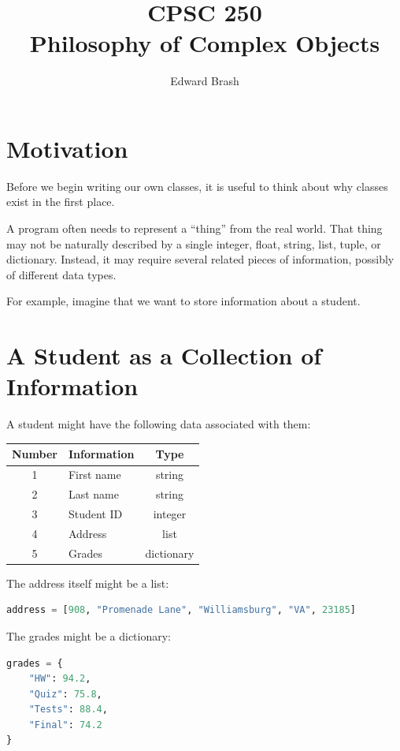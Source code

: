 \documentclass[11pt]{article}
\title{CPSC 250 \\ Philosophy of Complex Objects}
\author{Edward Brash}
\date{}
\begin{document}
\maketitle

\section{Motivation}

Before we begin writing our own classes, it is useful to think about why classes exist in the first place.

A program often needs to represent a ``thing'' from the real world. That thing may not be naturally described by a single integer, float, string, list, tuple, or dictionary. Instead, it may require several related pieces of information, possibly of different data types.

For example, imagine that we want to store information about a student.

\section{A Student as a Collection of Information}

A student might have the following data associated with them:

\begin{center}
\begin{tabular}{clc}
\toprule
Number & Information & Type \\
\midrule
1 & First name & string \\
2 & Last name & string \\
3 & Student ID & integer \\
4 & Address & list \\
5 & Grades & dictionary \\
\bottomrule
\end{tabular}
\end{center}

The address itself might be a list:

\begin{lstlisting}[language=Python]
address = [908, "Promenade Lane", "Williamsburg", "VA", 23185]
\end{lstlisting}

The grades might be a dictionary:

\begin{lstlisting}[language=Python]
grades = {
    "HW": 94.2,
    "Quiz": 75.8,
    "Tests": 88.4,
    "Final": 74.2
}
\end{lstlisting}
\end{document}
